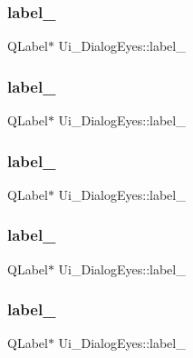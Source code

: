 \subsubsection{\texorpdfstring{label\+\_}{label\_4}}
{\footnotesize\ttfamily Q\+Label$\ast$ Ui\+\_\+\+Dialog\+Eyes\+::label\+\_}

\hypertarget{class_ui___dialog_eyes_a2baff1eaac5a1f56aa1069ea7338da04}{}\label{class_ui___dialog_eyes_a2baff1eaac5a1f56aa1069ea7338da04} 
\subsubsection{\texorpdfstring{label\+\_}{label\_5}}
{\footnotesize\ttfamily Q\+Label$\ast$ Ui\+\_\+\+Dialog\+Eyes\+::label\+\_}

\hypertarget{class_ui___dialog_eyes_ac0330213bbebb84107c2970edb1f8eeb}{}\label{class_ui___dialog_eyes_ac0330213bbebb84107c2970edb1f8eeb} 
\subsubsection{\texorpdfstring{label\+\_}{label\_6}}
{\footnotesize\ttfamily Q\+Label$\ast$ Ui\+\_\+\+Dialog\+Eyes\+::label\+\_}

\hypertarget{class_ui___dialog_eyes_ae8541d3c768ed2c09a8bbf8154c1d2f8}{}\label{class_ui___dialog_eyes_ae8541d3c768ed2c09a8bbf8154c1d2f8} 
\subsubsection{\texorpdfstring{label\+\_}{label\_7}}
{\footnotesize\ttfamily Q\+Label$\ast$ Ui\+\_\+\+Dialog\+Eyes\+::label\+\_}

\hypertarget{class_ui___dialog_eyes_a70abfa97c9448788a4895316f88c0603}{}\label{class_ui___dialog_eyes_a70abfa97c9448788a4895316f88c0603} 
\subsubsection{\texorpdfstring{label\+\_}{label\_8}}
{\footnotesize\ttfamily Q\+Label$\ast$ Ui\+\_\+\+Dialog\+Eyes\+::label\+\_}

